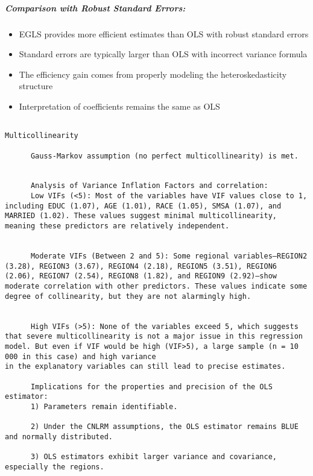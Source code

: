 \documentclass[
]{article}
\providecommand{\tightlist}{%
  \setlength{\itemsep}{0pt}\setlength{\parskip}{0pt}}
\begin{document}
\subparagraph{\texorpdfstring{\textbf{Comparison with Robust Standard
Errors:}}{Comparison with Robust Standard Errors:}}\label{comparison-with-robust-standard-errors}

\begin{itemize}
\tightlist
\item
  EGLS provides more efficient estimates than OLS with robust standard
  errors
\item
  Standard errors are typically larger than OLS with incorrect variance
  formula
\item
  The efficiency gain comes from properly modeling the
  heteroskedasticity structure
\item
  Interpretation of coefficients remains the same as OLS
\end{itemize}

\begin{verbatim}

Multicollinearity

      Gauss-Markov assumption (no perfect multicollinearity) is met.
      

      Analysis of Variance Inflation Factors and correlation:
      Low VIFs (<5): Most of the variables have VIF values close to 1, including EDUC (1.07), AGE (1.01), RACE (1.05), SMSA (1.07), and MARRIED (1.02). These values suggest minimal multicollinearity, meaning these predictors are relatively independent.

      
      Moderate VIFs (Between 2 and 5): Some regional variables—REGION2 (3.28), REGION3 (3.67), REGION4 (2.18), REGION5 (3.51), REGION6 (2.06), REGION7 (2.54), REGION8 (1.82), and REGION9 (2.92)—show moderate correlation with other predictors. These values indicate some degree of collinearity, but they are not alarmingly high.
      

      High VIFs (>5): None of the variables exceed 5, which suggests that severe multicollinearity is not a major issue in this regression model. But even if VIF would be high (VIF>5), a large sample (n = 10 000 in this case) and high variance
in the explanatory variables can still lead to precise estimates.

      Implications for the properties and precision of the OLS estimator:
      1) Parameters remain identifiable.

      2) Under the CNLRM assumptions, the OLS estimator remains BLUE and normally distributed.

      3) OLS estimators exhibit larger variance and covariance, especially the regions.


\end{verbatim}
\end{document}
